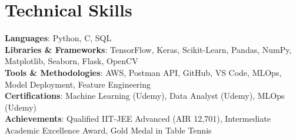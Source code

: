 \documentclass[letterpaper,10pt]{article}
\begin{document}
\section{Technical Skills}
  \vspace{-7pt}
  \begin{itemize}[leftmargin=0.15in, label={}]\small{\item{
    \textbf{Languages}{: Python, C, SQL} \\
    \textbf{Libraries \& Frameworks}{: TensorFlow, Keras, Scikit-Learn, Pandas, NumPy, Matplotlib, Seaborn, Flask, OpenCV} \\
    \textbf{Tools \& Methodologies}{: AWS, Postman API, GitHub, VS Code, MLOps, Model Deployment, Feature Engineering} \\
    \textbf{Certifications}{: Machine Learning (Udemy), Data Analyst (Udemy), MLOps (Udemy)} \\
    \textbf{Achievements}{: Qualified IIT-JEE Advanced (AIR 12,701), Intermediate Academic Excellence Award, Gold Medal in Table Tennis}
  }}
  \end{itemize}
\end{document}
